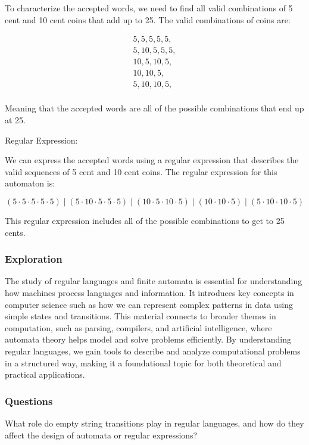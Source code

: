 \documentclass{article}
\theoremstyle{theorem}
\theoremstyle{definition}
\theoremstyle{remark}
\begin{document}
To characterize the accepted words, we need to find all valid combinations of 5 cent and 10 cent coins that add up to 25. The valid combinations of coins are:

\[
\begin{aligned}
    5, 5, 5, 5, 5, \\
    5, 10, 5, 5, 5, \\
    10, 5, 10, 5, \\
    10, 10, 5, \\
    5, 10, 10, 5, \\
\end{aligned}
\]


Meaning that the accepted words are all of the possible combinations that end up at 25.

Regular Expression:

We can express the accepted words using a regular expression that describes the valid sequences of 5 cent and 10 cent coins. The regular expression for this automaton is:

\[
(5 \cdot 5 \cdot 5 \cdot 5 \cdot 5) \mid (5 \cdot 10 \cdot 5 \cdot 5 \cdot 5) \mid (10 \cdot 5 \cdot 10 \cdot 5) \mid (10 \cdot 10 \cdot 5) \mid (5 \cdot 10 \cdot 10 \cdot 5)
\]

This regular expression includes all of the possible combinations to get to 25 cents.


\subsubsection{Exploration}

The study of regular languages and finite automata is essential for understanding how machines process languages and information. It introduces key concepts in computer science such as how we can represent complex patterns in data using simple states and transitions. This material connects to broader themes in computation, such as parsing, compilers, and artificial intelligence, where automata theory helps model and solve problems efficiently. By understanding regular languages, we gain tools to describe and analyze computational problems in a structured way, making it a foundational topic for both theoretical and practical applications.


\subsubsection{Questions}

What role do empty string transitions play in regular languages, and how do they affect the design of automata or regular expressions?
\end{document}
